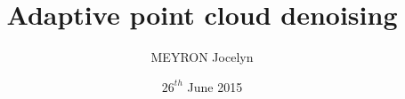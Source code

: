 \documentclass[12pt, a4paper]{memoir} %
\title{Adaptive point cloud denoising}%
\author{MEYRON Jocelyn}
\date{$ 26^{th} $ June 2015} %
\begin{document}
\frontmatter
\begin{titlingpage}
\maketitle
\end{titlingpage}
\setlength{\parskip}{-1pt plus 1pt}


\cleardoublepage

\tableofcontents* %
\normalsize

\mainmatter
\SingleSpace







\backmatter
\appendix







\end{document}

